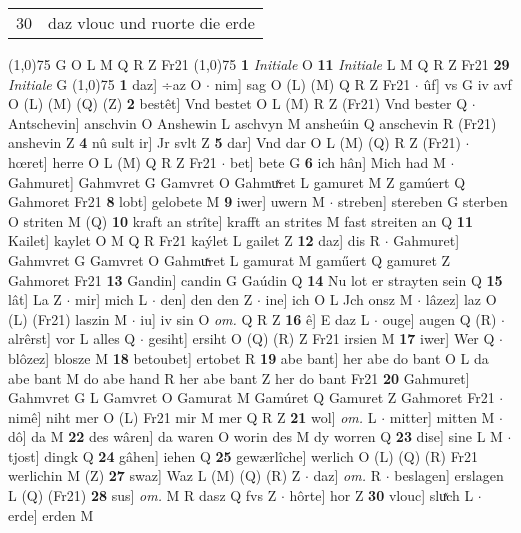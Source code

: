 \documentclass[8pt,a4paper,notitlepage]{article}
\begin{document}
\begin{table}[ht]
\begin{minipage}[t]{0.5\linewidth}
\begin{tabular}{rl}
30 & daz vlouc und ruorte die erde\\ 
\end{tabular}
\scriptsize
\line(1,0){75} \newline
G O L M Q R Z Fr21 \newline
\line(1,0){75} \newline
\textbf{1} \textit{Initiale} O  \textbf{11} \textit{Initiale} L M Q R Z Fr21  \textbf{29} \textit{Initiale} G  \newline
\line(1,0){75} \newline
\textbf{1} daz] ÷az O  $\cdot$ nim] sag O (L) (M) Q R Z Fr21  $\cdot$ ûf] vs G iv avf O (L) (M) (Q) (Z) \textbf{2} bestêt] Vnd bestet O L (M) R Z (Fr21) Vnd bester Q  $\cdot$ Antschevin] anschvin O Anshewin L aschvyn M ansheúin Q anschevin R (Fr21) anshevin Z \textbf{4} nû sult ir] Jr svlt Z \textbf{5} dar] Vnd dar O L (M) (Q) R Z (Fr21)  $\cdot$ hœret] herre O L (M) Q R Z Fr21  $\cdot$ bet] bete G \textbf{6} ich hân] Mich had M  $\cdot$ Gahmuret] Gahmvret G Gamvret O Gahmuͯret L gamuret M Z gamúert Q Gahmoret Fr21 \textbf{8} lobt] gelobete M \textbf{9} iwer] uwern M  $\cdot$ streben] stereben G sterben O striten M (Q) \textbf{10} kraft an strîte] krafft an strites M fast streiten an Q \textbf{11} Kailet] kaylet O M Q R Fr21 kaýlet L gailet Z \textbf{12} daz] dis R  $\cdot$ Gahmuret] Gahmvret G Gamvret O Gahmuͯret L gamurat M gaműert Q gamuret Z Gahmoret Fr21 \textbf{13} Gandin] candin G Gaúdin Q \textbf{14} Nu lot er strayten sein Q \textbf{15} lât] La Z  $\cdot$ mir] mich L  $\cdot$ den] den den Z  $\cdot$ ine] ich O L Jch onsz M  $\cdot$ lâzez] laz O (L) (Fr21) laszin M  $\cdot$ iu] iv sin O \textit{om.} Q R Z \textbf{16} ê] E daz L  $\cdot$ ouge] augen Q (R)  $\cdot$ alrêrst] vor L alles Q  $\cdot$ gesiht] ersiht O (Q) (R) Z Fr21 irsien M \textbf{17} iwer] Wer Q  $\cdot$ blôzez] blosze M \textbf{18} betoubet] ertobet R \textbf{19} abe bant] her abe do bant O L da abe bant M do abe hand R her abe bant Z her do bant Fr21 \textbf{20} Gahmuret] Gahmvret G L Gamvret O Gamurat M Gamúret Q Gamuret Z Gahmoret Fr21  $\cdot$ nimê] niht mer O (L) Fr21 mir M mer Q R Z \textbf{21} wol] \textit{om.} L  $\cdot$ mitter] mitten M  $\cdot$ dô] da M \textbf{22} des wâren] da waren O worin des M dy worren Q \textbf{23} dise] sine L M  $\cdot$ tjost] dingk Q \textbf{24} gâhen] iehen Q \textbf{25} gewærlîche] werlich O (L) (Q) (R) Fr21 werlichin M (Z) \textbf{27} swaz] Waz L (M) (Q) (R) Z  $\cdot$ daz] \textit{om.} R  $\cdot$ beslagen] erslagen L (Q) (Fr21) \textbf{28} sus] \textit{om.} M R dasz Q fvs Z  $\cdot$ hôrte] hor Z \textbf{30} vlouc] sluͯch L  $\cdot$ erde] erden M \newline

\end{minipage}
\end{table}
\end{document}
